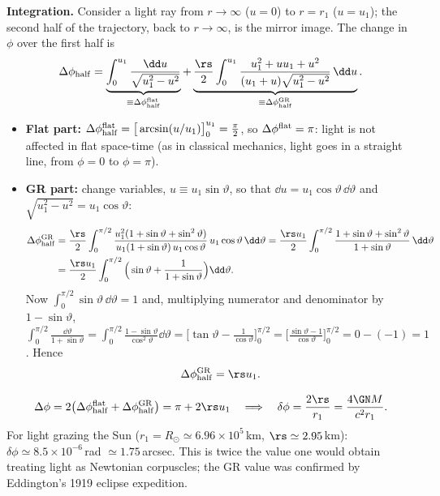 \textbf{Integration.} Consider a light ray from $r\to\infty$ ($u=0$) to $r=r_1$ ($u=u_1$); the second half of the trajectory, back to $r\to\infty$, is the mirror image. The change in $\phi$ over the first half is
\[
  \Delta\phi_{\rm half}=\underbrace{\int_0^{u_1}\frac{\dd u}{\sqrt{u_1^2-u^2}}}_{\equiv\Delta\phi^{\rm flat}_{\rm half}}
  +\underbrace{\frac\rs2\int_0^{u_1}\frac{u_1^2+uu_1+u^2}{(u_1+u)\sqrt{u_1^2-u^2}}\,\dd u}_{\equiv\Delta\phi^{\rm GR}_{\rm half}} .
\]
\begin{itemize}
\item \textbf{Flat part:} $\Delta\phi^{\rm flat}_{\rm half}=\big[\arcsin(u/u_1)\big]_0^{u_1}=\frac\pi2$, so $\Delta\phi^{\rm flat}=\pi$: light is not affected in flat space-time (as in classical mechanics, light goes in a straight line, from $\phi=0$ to $\phi=\pi$).
\item \textbf{GR part:} change variables, $u\equiv u_1\sin\vartheta$, so that $\dd u=u_1\cos\vartheta\,\dd\vartheta$ and $\sqrt{u_1^2-u^2}=u_1\cos\vartheta$:
\begin{align*}
  \Delta\phi^{\rm GR}_{\rm half}&=\frac\rs2\int_0^{\pi/2}\frac{u_1^2(1+\sin\vartheta+\sin^2\vartheta)}{u_1(1+\sin\vartheta)\,u_1\cos\vartheta}\,u_1\cos\vartheta\,\dd\vartheta
  =\frac{\rs u_1}{2}\int_0^{\pi/2}\frac{1+\sin\vartheta+\sin^2\vartheta}{1+\sin\vartheta}\,\dd\vartheta\\
  &=\frac{\rs u_1}{2}\int_0^{\pi/2}\Big(\sin\vartheta+\frac{1}{1+\sin\vartheta}\Big)\dd\vartheta .
\end{align*}
Now $\int_0^{\pi/2}\sin\vartheta\,\dd\vartheta=1$ and, multiplying numerator and denominator by $1-\sin\vartheta$,
$\int_0^{\pi/2}\frac{\dd\vartheta}{1+\sin\vartheta}=\int_0^{\pi/2}\frac{1-\sin\vartheta}{\cos^2\vartheta}\dd\vartheta=\Big[\tan\vartheta-\frac{1}{\cos\vartheta}\Big]_0^{\pi/2}=\Big[\frac{\sin\vartheta-1}{\cos\vartheta}\Big]_0^{\pi/2}=0-(-1)=1$. Hence
\begin{equation}
  \Delta\phi^{\rm GR}_{\rm half}=\rs u_1 .
\end{equation}
\end{itemize}

\begin{keyresult}
\begin{equation}
  \Delta\phi=2\big(\Delta\phi^{\rm flat}_{\rm half}+\Delta\phi^{\rm GR}_{\rm half}\big)=\pi+2\rs u_1
  \quad\Longrightarrow\quad\delta\phi=\frac{2\rs}{r_1}=\frac{4\GN M}{c^2r_1}.
\end{equation}
For light grazing the Sun ($r_1=R_\odot\simeq6.96\times10^5$\,km, $\rs\simeq2.95$\,km): $\delta\phi\simeq8.5\times10^{-6}$\,rad $\simeq1.75$\,arcsec. This is twice the value one would obtain treating light as Newtonian corpuscles; the GR value was confirmed by Eddington's 1919 eclipse expedition.
\end{keyresult}

